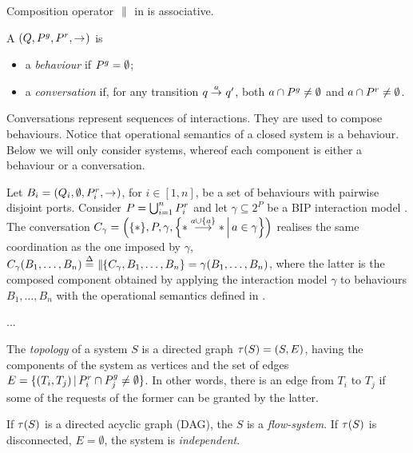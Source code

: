 \begin{proposition}
  \label{prop:associativity}
  Composition operator $\compose$ in  is associative.
\end{proposition}

\begin{definition}
  \label{defn:components}
  A \compmodel{} $(Q, \pin, \pout, \goesto)$ is
  \begin{itemize}
  \item a {\em behaviour} if $\pin  = \emptyset$;
  \item a \emph{conversation} if, for any transition $q \goesto[a] q'$, both
    $a \cap \pin \neq \emptyset$ and $a \cap \pout \neq \emptyset$.
  \end{itemize}
\end{definition}

Conversations represent sequences of interactions. They are used to compose
behaviours.  Notice that operational semantics of a closed system is a
behaviour.  Below we will only consider systems, whereof each component is
either a behaviour or a conversation.

\begin{example}
  \label{ex:bip}
  Let $B_i = (Q_i, \emptyset, \pout_i, \goesto)$, for $i \in [1,n]$, be a
  set of behaviours with pairwise disjoint ports.  Consider $P =
  \bigcup_{i=1}^n \pout_i$ and let $\gamma \subseteq 2^P$ be a BIP
  interaction model \cite{BliSif07-acp-emsoft}.  The conversation $C_\gamma
  = \Big(\{*\}, P, \gamma, \Setdef{* \longgoesto[a\cup\{a\}] *}{a \in
  \gamma}\Big)$ realises the same coordination as the one imposed by
  $\gamma$, \ie $C_\gamma(B_1, \dots, B_n) \bydef{=} \compose[\{C_\gamma,
  B_1, \dots, B_n\}] = \gamma(B_1, \dots, B_n)$, where the latter is the
  composed component obtained by applying the interaction model $\gamma$ to
  behaviours $B_1, \dots, B_n$ with the operational semantics defined in
  \cite{BliSif07-acp-emsoft}.
\end{example}

\begin{example}
  \label{ex:network}
  ...
\end{example}

\begin{definition}[Topologies]
  The {\em topology} of a system $S$ is a directed graph $\topo{S} =
  (S, E)$, having the components of the system as vertices and the set
  of edges $E = \setdef{(T_i,T_j)}{\pout_i \cap \pin_j \neq
    \emptyset}$.  In other words, there is an edge from $T_i$ to $T_j$
  if some of the requests of the former can be granted by the latter.

  If $\topo{S}$ is a directed acyclic graph (DAG), the $S$ is a {\em
  flow-system}.  If $\topo{S}$ is disconnected, \ie $E = \emptyset$, the
  system is {\em independent}.
\end{definition}

